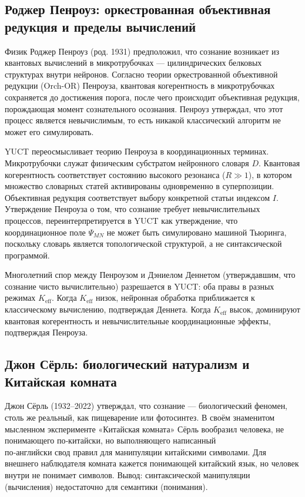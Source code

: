 \documentclass[12pt,a4paper]{article}
\begin{document}
	\subsection{Роджер Пенроуз: оркестрованная объективная редукция и пределы вычислений}
	
	Физик Роджер Пенроуз (род. 1931) предположил, что сознание возникает из квантовых вычислений в микротрубочках — цилиндрических белковых структурах внутри нейронов. Согласно теории оркестрованной объективной редукции (Orch-OR) Пенроуза, квантовая когерентность в микротрубочках сохраняется до достижения порога, после чего происходит объективная редукция, порождающая момент сознательного осознания. Пенроуз утверждал, что этот процесс является невычислимым, то есть никакой классический алгоритм не может его симулировать.
	
	YUCT переосмысливает теорию Пенроуза в координационных терминах. Микротрубочки служат физическим субстратом нейронного словаря \(D\). Квантовая когерентность соответствует состоянию высокого резонанса (\(R \gg 1\)), в котором множество словарных статей активированы одновременно в суперпозиции. Объективная редукция соответствует выбору конкретной статьи индексом \(I\). Утверждение Пенроуза о том, что сознание требует невычислительных процессов, переинтерпретируется в YUCT как утверждение, что координационное поле \(\Psi_{MN}\) не может быть симулировано машиной Тьюринга, поскольку словарь является топологической структурой, а не синтаксической программой.
	
	Многолетний спор между Пенроузом и Дэниелом Деннетом (утверждавшим, что сознание чисто вычислительно) разрешается в YUCT: оба правы в разных режимах \(K_{\mathrm{eff}}\). Когда \(K_{\mathrm{eff}}\) низок, нейронная обработка приближается к классическому вычислению, подтверждая Деннета. Когда \(K_{\mathrm{eff}}\) высок, доминируют квантовая когерентность и невычислительные координационные эффекты, подтверждая Пенроуза.
	
	\subsection{Джон Сёрль: биологический натурализм и Китайская комната}
	
	Джон Сёрль (1932–2022) утверждал, что сознание — биологический феномен, столь же реальный, как пищеварение или фотосинтез. В своём знаменитом мысленном эксперименте «Китайская комната» Сёрль вообразил человека, не понимающего по‑китайски, но выполняющего написанный \\ по‑английски свод правил для манипуляции китайскими символами. Для внешнего наблюдателя комната кажется понимающей китайский язык, но человек внутри не понимает символов. Вывод: синтаксической манипуляции (вычисления) недостаточно для семантики (понимания).
	
\end{document}
